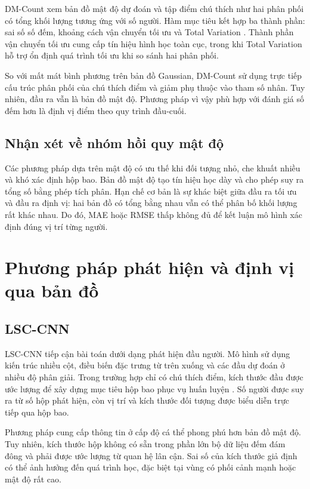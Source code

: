 DM-Count xem bản đồ mật độ dự đoán và tập điểm chú thích như hai phân phối có tổng khối lượng tương ứng với số người. Hàm mục tiêu kết hợp ba thành phần: sai số số đếm, khoảng cách vận chuyển tối ưu và Total Variation \cite{wang2020dmcount}. Thành phần vận chuyển tối ưu cung cấp tín hiệu hình học toàn cục, trong khi Total Variation hỗ trợ ổn định quá trình tối ưu khi so sánh hai phân phối.

So với mất mát bình phương trên bản đồ Gaussian, DM-Count sử dụng trực tiếp cấu trúc phân phối của chú thích điểm và giảm phụ thuộc vào tham số nhân. Tuy nhiên, đầu ra vẫn là bản đồ mật độ. Phương pháp vì vậy phù hợp với đánh giá số đếm hơn là định vị điểm theo quy trình đầu-cuối.

\subsection{Nhận xét về nhóm hồi quy mật độ}

Các phương pháp dựa trên mật độ có ưu thế khi đối tượng nhỏ, che khuất nhiều và khó xác định hộp bao. Bản đồ mật độ tạo tín hiệu học dày và cho phép suy ra tổng số bằng phép tích phân. Hạn chế cơ bản là sự khác biệt giữa đầu ra tối ưu và đầu ra định vị: hai bản đồ có tổng bằng nhau vẫn có thể phân bố khối lượng rất khác nhau. Do đó, MAE hoặc RMSE thấp không đủ để kết luận mô hình xác định đúng vị trí từng người.

\section{Phương pháp phát hiện và định vị qua bản đồ}

\subsection{LSC-CNN}

LSC-CNN tiếp cận bài toán dưới dạng phát hiện đầu người. Mô hình sử dụng kiến trúc nhiều cột, điều biến đặc trưng từ trên xuống và các đầu dự đoán ở nhiều độ phân giải. Trong trường hợp chỉ có chú thích điểm, kích thước đầu được ước lượng để xây dựng mục tiêu hộp bao phục vụ huấn luyện \cite{sam2021lsccnn}. Số người được suy ra từ số hộp phát hiện, còn vị trí và kích thước đối tượng được biểu diễn trực tiếp qua hộp bao.

Phương pháp cung cấp thông tin ở cấp độ cá thể phong phú hơn bản đồ mật độ. Tuy nhiên, kích thước hộp không có sẵn trong phần lớn bộ dữ liệu đếm đám đông và phải được ước lượng từ quan hệ lân cận. Sai số của kích thước giả định có thể ảnh hưởng đến quá trình học, đặc biệt tại vùng có phối cảnh mạnh hoặc mật độ rất cao.

